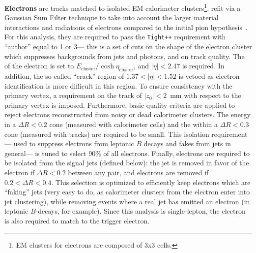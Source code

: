 \textbf{Electrons} are tracks matched to isolated EM calorimeter clusters\footnote{EM clusters for electrons are composed of 3x3 cells.}, refit via a Gaussian Sum Filter technique to take into account the larger material interactions and radiations of electrons compared to the initial pion hypothesis~\cite{Aad:2014nim,Aad:2014fxa,ATLAS-CONF-2014-032,ATLAS-CONF-2012-047}. For this analysis, they are required to pass the \texttt{Tight++} requirement with ``author'' equal to 1 or 3--- this is a set of cuts on the shape of the electron cluster which suppresses backgrounds from jets and photons, and on track quality. The \pt of the electron is set to $E_\mathrm{cluster} / \cosh \eta_\mathrm{cluster}$, and $|\eta| < 2.47$ is required. In addition, the so-called ``crack'' region of $1.37 < |\eta| < 1.52$ is vetoed as electron identification is more difficult in this region. To ensure consistency with the primary vertex, a requirement on the track of $|z_0| < 2$~mm with respect to the primary vertex is imposed. Furthermore, basic quality criteria are applied to reject electrons reconstructed from noisy or dead calorimeter clusters. The energy in a $\Delta R < 0.2$ cone (measured with calorimeter cells) and the \pt within a $\Delta R < 0.3$ cone (measured with tracks) are required to be small. This isolation requirement--- used to suppress electrons from leptonic $B$ decays and fakes from jets in general--- is tuned to select $90\%$ of all electrons. Finally, electrons are required to be isolated from the signal jets (defined below): the jet is removed in favor of the electron if $\Delta R < 0.2$ between any pair, and electrons are removed if $0.2 < \Delta R < 0.4$. This selection is optimized to efficiently keep electrons which are ``faking'' jets (very easy to do, as calorimeter clusters from the electron enter into jet clustering), while removing events where a real jet has emitted an electron (in leptonic $B$-decays, for example). Since this analysis is single-lepton, the electron is also required to match to the trigger electron.

